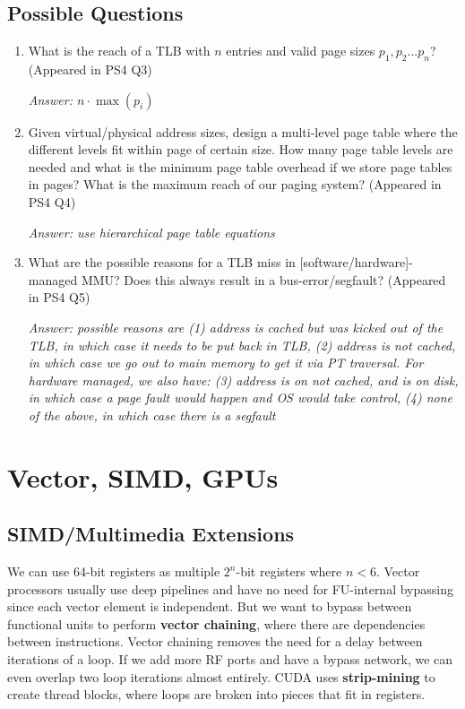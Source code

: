 \documentclass{article}
\begin{document}
\subsection{Possible Questions}

\begin{enumerate}
\item What is the reach of a TLB with $n$ entries and valid page sizes $p_1, p_2 ... p_n$? (Appeared in PS4 Q3)

\textit{Answer: $n \cdot \max(p_i)$}

\item Given virtual/physical address sizes, design a multi-level page table where the different levels fit within page of certain size. How many page table levels are needed and what is the minimum page table overhead if we store page tables in pages? What is the maximum reach of our paging system? (Appeared in PS4 Q4)

\textit{Answer: use hierarchical page table equations}

\item What are the possible reasons for a TLB miss in [software/hardware]-managed MMU? Does this always result in a bus-error/segfault? (Appeared in PS4 Q5)

\textit{Answer: possible reasons are (1) address is cached but was kicked out of the TLB, in which case it needs to be put back in TLB, (2) address is not cached, in which case we go out to main memory to get it via PT traversal. For hardware managed, we also have: (3) address is on not cached, and is on disk, in which case a page fault would happen and OS would take control, (4) none of the above, in which case there is a segfault}
\end{enumerate}

\section{Vector, SIMD, GPUs}

\subsection{SIMD/Multimedia Extensions}
We can use 64-bit registers as multiple $2^n$-bit registers where $n < 6$. Vector processors usually use deep pipelines and have no need for FU-internal bypassing since each vector element is independent. But we want to bypass between functional units to perform \textbf{vector chaining}, where there are dependencies between instructions. Vector chaining removes the need for a delay between iterations of a loop. If we add more RF ports and have a bypass network, we can even overlap two loop iterations almost entirely. CUDA uses \textbf{strip-mining} to create thread blocks, where loops are broken into pieces that fit in registers.
\end{document}
